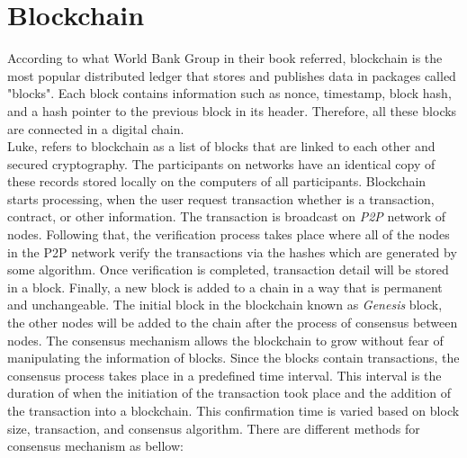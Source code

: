 \section{Blockchain} According to what World Bank Group in their book referred, blockchain is the most popular distributed ledger that stores and publishes data in packages called "blocks". Each block contains information such as nonce, timestamp, block hash, and a hash pointer to the previous block in its header. Therefore, all these blocks are connected in a digital chain\cite{DLT}. \\
Luke\cite{Luke}, refers to blockchain as a list of blocks that are linked to each other and secured cryptography. The participants on networks have an identical copy of these records stored locally on the computers of all participants. Blockchain starts processing, when the user request transaction whether is a transaction, contract, or other information. The transaction is broadcast on \textit{P2P} network of nodes. Following that, the verification process takes place where all of the nodes in the P2P network verify the transactions via the hashes which are generated by some algorithm. Once verification is completed, transaction detail will be stored in a block. Finally, a new block is added to a chain in a way that is permanent and unchangeable\cite{Luke}. The initial block in the blockchain known as \textit{Genesis} block, the other nodes will be added to the chain after the process of consensus between nodes. The consensus mechanism allows the blockchain to grow without fear of manipulating the information of blocks. Since the blocks contain transactions, the consensus process takes place in a predefined time interval. This interval is the duration of when the initiation of the transaction took place and the addition of the transaction into a blockchain. This confirmation time is varied based on block size, transaction, and consensus algorithm. There are different methods for consensus mechanism as bellow: 
